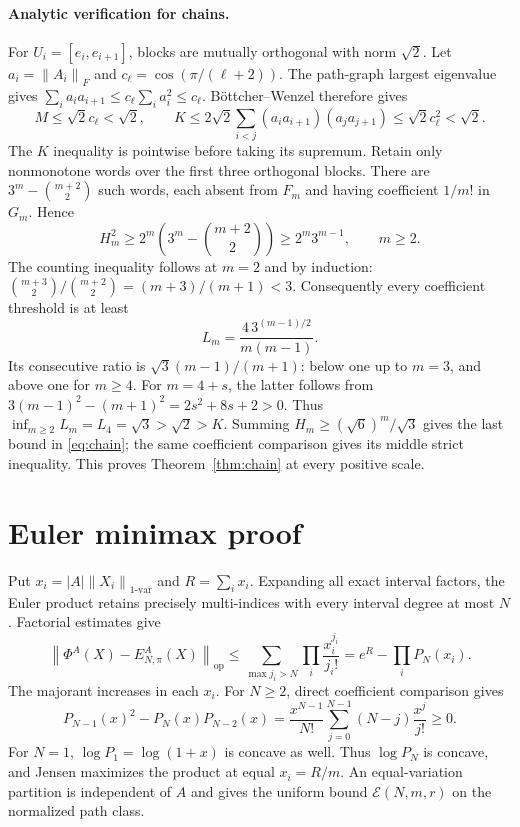 \documentclass[11pt,a4paper]{article}
\newcommand{\op}{\mathrm{op}}
\newcommand{\E}{\mathcal E}
\newcommand{\norm}[1]{\left\lVert#1\right\rVert}
\begin{document}
\paragraph{Analytic verification for chains.}
For \(U_i=[e_i,e_{i+1}]\), blocks are mutually orthogonal with norm \(\sqrt2\).
Let \(a_i=\norm{A_i}_F\) and \(c_\ell=\cos(\pi/(\ell+2))\).
The path-graph largest eigenvalue gives
\(\sum_i a_i a_{i+1}\le c_\ell\sum_i a_i^2\le c_\ell\).
B\"ottcher--Wenzel therefore gives
\[
 M\le\sqrt2c_\ell<\sqrt2,\qquad
 K\le2\sqrt2\sum_{i<j}(a_i a_{i+1})(a_j a_{j+1})
 \le\sqrt2c_\ell^2<\sqrt2.
\]
The \(K\) inequality is pointwise before taking its supremum.
Retain only nonmonotone words over the first three orthogonal blocks.
There are \(3^m-\binom{m+2}{2}\) such words, each absent from \(F_m\)
and having coefficient \(1/m!\) in \(G_m\). Hence
\[
 H_m^2\ge2^m(3^m-\binom{m+2}{2})\ge2^m3^{m-1},\qquad m\ge2.
\]
The counting inequality follows at \(m=2\) and by induction:
\(\binom{m+3}{2}/\binom{m+2}{2}=(m+3)/(m+1)<3\).
Consequently every coefficient threshold is at least
\[
 L_m=\frac{4\,3^{(m-1)/2}}{m(m-1)}.
\]
Its consecutive ratio is \(\sqrt3(m-1)/(m+1)\):
below one up to \(m=3\), and above one for \(m\ge4\).
For \(m=4+s\), the latter follows from
\(3(m-1)^2-(m+1)^2=2s^2+8s+2>0\).
Thus \(\inf_{m\ge2}L_m=L_4=\sqrt3>\sqrt2>K\).
Summing \(H_m\ge(\sqrt6)^m/\sqrt3\) gives the last bound in
\eqref{eq:chain}; the same coefficient comparison gives its middle strict
inequality. This proves Theorem~\ref{thm:chain} at every positive scale.

\section{Euler minimax proof}\label{app:euler}
Put \(x_i=|A|\norm{X_i}_{1\text{-var}}\) and \(R=\sum_i x_i\).
Expanding all exact interval factors, the Euler product retains precisely
multi-indices with every interval degree at most \(N\). Factorial estimates give
\[
 \norm{\Phi^A(X)-E^A_{N,\pi}(X)}_{\op}
 \le\sum_{\max j_i>N}\prod_i\frac{x_i^{j_i}}{j_i!}
 =e^R-\prod_iP_N(x_i).
\]
The majorant increases in each \(x_i\).
For \(N\ge2\), direct coefficient comparison gives
\[
 P_{N-1}(x)^2-P_N(x)P_{N-2}(x)
 =\frac{x^{N-1}}{N!}\sum_{j=0}^{N-1}(N-j)\frac{x^j}{j!}\ge0.
\]
For \(N=1\), \(\log P_1=\log(1+x)\) is concave as well.
Thus \(\log P_N\) is concave, and Jensen maximizes the product at equal
\(x_i=R/m\). An equal-variation partition is independent of \(A\) and gives
the uniform bound \(\E(N,m,r)\) on the normalized path class.
\end{document}
